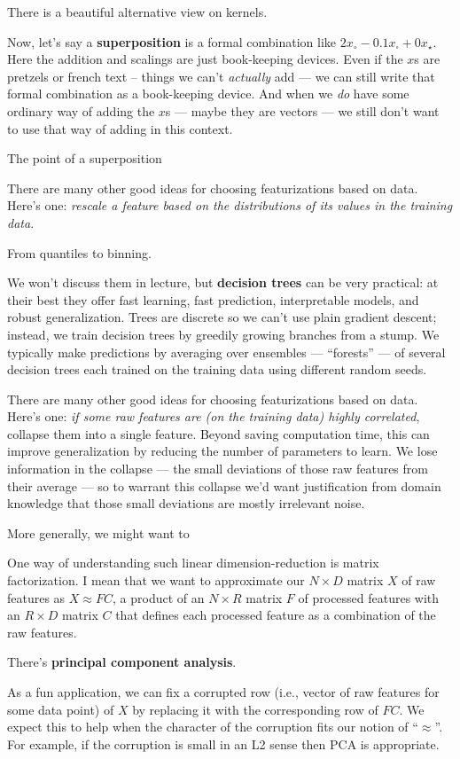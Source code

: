   There is a beautiful alternative view on kernels.

  Now, let's say a \textbf{superposition} is a formal combination like
  $2 x_\circ - 0.1 x_\square + 0 x_\star$.  Here the addition and scalings
  are just book-keeping devices.  Even if the $x$s are pretzels or french text
  -- things we can't \emph{actually} add --- we can still write that formal
  combination as a book-keeping device.  And when we \emph{do} have some
  ordinary way of adding the $x$s --- maybe they are vectors --- we still
  don't want to use that way of adding in this context.

  The point of a superposition

  There are many other good ideas for choosing featurizations based on data.
  Here's one: \emph{rescale a feature based on the distributions of its values
  in the training data}.

  From quantiles to binning.



  We won't discuss them in lecture, but \textbf{decision trees} can be very
  practical: at their best they offer fast learning, fast prediction,
  interpretable models, and robust generalization.  Trees are discrete so we
  can't use plain gradient descent; instead, we train decision trees by
  greedily growing branches from a stump.  We typically make predictions by
  averaging over ensembles --- ``forests'' --- of several decision trees each
  trained on the training data using different random seeds.

  There are many other good ideas for choosing featurizations based on data.
  Here's one: \emph{if some raw features are (on the training data) highly
  correlated}, collapse them into a single feature.  Beyond saving computation
  time, this can improve generalization by reducing the number of parameters to
  learn.  We lose information in the collapse --- the small deviations of those
  raw features from their average --- so to warrant this collapse we'd want justification from domain knowledge
  that those small deviations are mostly irrelevant noise.

  More generally, we might want to 

  One way of understanding such linear dimension-reduction is matrix
  factorization.  I mean that we want to approximate our $N\times D$ matrix $X$
  of raw features as $X \approx F C$, a product of an $N\times R$ matrix $F$ of
  processed features with an $R\times D$ matrix $C$ that defines each processed
  feature as a combination of the raw features.

  There's \textbf{principal component analysis}.

  As a fun application, we can fix a corrupted row (i.e., vector of raw
  features for some data point) of $X$ by replacing it with the corresponding
  row of $F C$.  We expect this to help when the character of the corruption
  fits our notion of ``$\approx$''.  For example, if the corruption is small
  in an L2 sense then PCA is appropriate.
